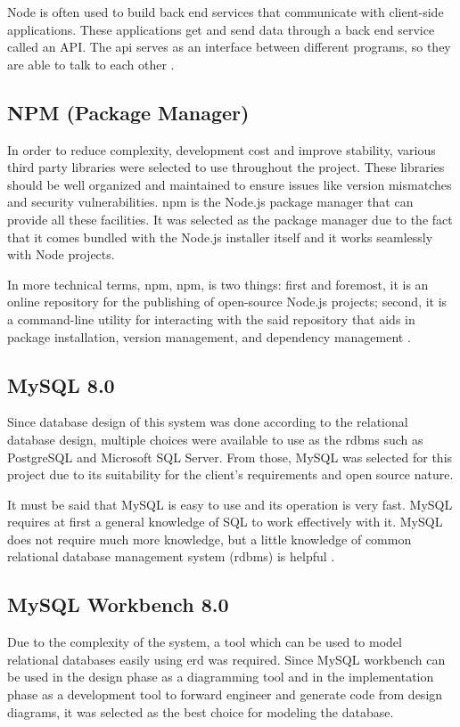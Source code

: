 \documentclass[12pt]{report}
\begin{document}
Node is often used to build back end services that communicate with client-side applications. These applications get and send data through a back end service called an API. The \acrshort{api} serves as an interface between different programs, so they are able to talk to each other \cite{teixeira_2013_nodejs}.

\subsection{NPM (Package Manager)}
In order to reduce complexity, development cost and improve stability, various third party libraries were selected to use throughout the project. These libraries should be well organized and maintained to ensure issues like version mismatches and security vulnerabilities. \acrshort{npm} is the Node.js package manager that can provide all these facilities. It was selected as the package manager due to the fact that it comes bundled with the Node.js installer itself and it works seamlessly with Node projects.

In more technical terms, \acrshort{npm}, \acrlong{npm}, is two things: first and foremost, it is an online repository for the publishing of open-source Node.js projects; second, it is a command-line utility for interacting with the said repository that aids in package installation, version management, and dependency management \cite{teixeira_2013_nodejs}.

\subsection{MySQL 8.0}
Since database design of this system was done according to the relational database design, multiple choices were available to use as the \acrlong{rdbms} such as PostgreSQL and Microsoft SQL Server. From those, MySQL was selected for this project due to its suitability for the client's requirements and open source nature.

It must be said that MySQL is easy to use and its operation is very fast. MySQL requires at
first a general knowledge of SQL to work effectively with it. MySQL does not require much
more knowledge, but a little knowledge of common relational database management
system (\acrshort{rdbms}) is helpful \cite{vanier_2019_mysql8}.

\subsection{MySQL Workbench 8.0}
Due to the complexity of the system, a tool which can be used to model relational databases easily using \acrshort{erd} was required. Since MySQL workbench can be used in the design phase as a diagramming tool and in the implementation phase as a development tool to forward engineer and generate code from design diagrams, it was selected as the best choice for modeling the database.
\end{document}
